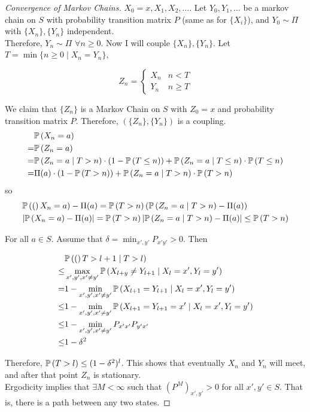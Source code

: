 \documentclass[english, course]{Notes}
\begin{document}
\begin{proof}[Convergence of Markov Chains]
	$X_0 = x, X_1, X_2, \dots$. Let $Y_0, Y_1, \dots$ be a markov chain on $S$ with probability transition matrix $P$ (same as for $\{X_i\}$), and $Y_0 \sim \Pi$ with $\{X_n\}, \{Y_n\}$ independent.\\
	
	Therefore, $Y_n \sim \Pi$ $\forall n \geq 0$. Now I will couple $\{X_n\}, \{Y_n\}$. Let $T = \min \{n \geq 0 \mid X_n = Y_n\}$, 
	
	\[Z_n = 
	\begin{cases}
		X_n & n < T\\
		Y_n & n \geq T
	\end{cases}
	\]
	
	We claim that $\{Z_n\}$ is a Markov Chain on $S$ with $Z_0 = x$ and probability transition matrix $P$. Therefore, $(\{Z_n\}, \{Y_n\})$ is a coupling.\\
	
	\begin{align*}
	&\mathbb{P}\left(X_n = a\right)\\
	=& \mathbb{P}\left(Z_n = a\right)\\
	=& \mathbb{P}\left(Z_n = a \mid T > n\right) \cdot (1- \mathbb{P}\left(T \leq n\right)) + \mathbb{P}\left(Z_n = a \mid T \leq n\right) \cdot \mathbb{P}\left(T \leq n\right)\\
	=& \Pi(a) \cdot (1 - \mathbb{P}\left(T > n\right)) + \mathbb{P}\left(Z_n = a \mid T > n\right) \cdot \mathbb{P}\left(T > n\right)
	\end{align*}
	so
	\begin{align*}
	&\mathbb{P}\left((\right)X_n = a) - \Pi(a) = \mathbb{P}\left(T > n\right)(\mathbb{P}\left(Z_n = a \mid T > n\right) - \Pi(a))\\
	&|\mathbb{P}\left(X_n = a\right) - \Pi(a)| = \mathbb{P}\left(T > n\right)|\mathbb{P}\left(Z_n = a \mid T > n\right) - \Pi(a)| \leq \mathbb{P}\left(T > n\right)
	\end{align*}
	
	For all $a \in S$. Assume that $\delta = \min_{x', y'} P_{x'y'} > 0$. Then
	
	\begin{align*}
	&\mathbb{P}\left((\right)T > l + 1 \mid T > l)\\
	\leq& \max_{x', y', x' \neq y'} \mathbb{P}\left(X_{l + y} \neq Y_{l + 1} \mid X_{l} = x', Y_{l} = y'\right)\\
	=& 1 -\min_{x', y', x' \neq y'} \mathbb{P}\left(X_{l + 1} = Y_{l + 1} \mid X_l = x', Y_l = y'\right)\\
	\leq& 1 - \min_{x', y', x' \neq y'} \mathbb{P}\left(X_{l + 1} = Y_{l + 1} = x' \mid X_l = x', Y_l = y'\right)\\
	\leq& 1 - \min_{x', y', x' \neq y'} P_{x'x'} P_{y'x'}\\
	\leq& 1 - \delta^2
	\end{align*}
	
	Therefore, $\mathbb{P}\left(T > l\right) \leq (1-\delta^2)^l$. This shows that eventually $X_n$ and $Y_n$ will meet, and after that point $Z_n$ is stationary.\\
	
	Ergodicity implies that $\exists M < \infty$ such that $(P^M)_{x', y'} > 0$ for all $x', y' \in S$. That is, there is a path between any two states.
\end{proof}
\end{document}
